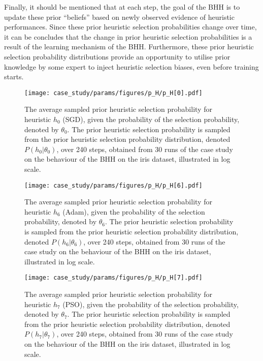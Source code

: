 Finally, it should be mentioned that at each step, the goal of the \acs{BHH} is to update these prior ``beliefs'' based on newly observed evidence of heuristic performances. Since these prior heuristic selection probabilities change over time, it can be concludes that the change in prior heuristic selection probabilities is a result of the learning mechanism of the \acs{BHH}. Furthermore, these prior heuristic selection probability distributions provide an opportunity to utilise prior knowledge by some expert to inject heuristic selection biases, even before training starts.

\begin{figure}[htpb]
	\centering
	\texttt{[image: case\_study/params/figures/p\_H/p\_H[0].pdf]}
	\caption{The average sampled prior heuristic selection probability for heuristic $h_{0}$ (\acs{SGD}), given the probability of the selection probability, denoted by $\theta_{0}$. The prior heuristic selection probability is sampled from the prior heuristic selection probability distribution, denoted $P(h_{0} \vert \theta_{0})$, over 240 steps, obtained from 30 runs of the case study on the behaviour of the \acs{BHH} on the iris dataset, illustrated in log scale.}
	\label{fig:results:case_study:p_H:0}
\end{figure}

\begin{figure}[htpb]
	\centering
	\texttt{[image: case\_study/params/figures/p\_H/p\_H[6].pdf]}
	\caption{The average sampled prior heuristic selection probability for heuristic $h_{6}$ (\acs{Adam}), given the probability of the selection probability, denoted by $\theta_{6}$. The prior heuristic selection probability is sampled from the prior heuristic selection probability distribution, denoted $P(h_{6} \vert \theta_{6})$, over 240 steps, obtained from 30 runs of the case study on the behaviour of the \acs{BHH} on the iris dataset, illustrated in log scale.}
	\label{fig:results:case_study:p_H:6}
\end{figure}

\begin{figure}[htpb]
	\centering
	\texttt{[image: case\_study/params/figures/p\_H/p\_H[7].pdf]}
	\caption{The average sampled prior heuristic selection probability for heuristic $h_{7}$ (\acs{PSO}), given the probability of the selection probability, denoted by $\theta_{7}$. The prior heuristic selection probability is sampled from the prior heuristic selection probability distribution, denoted $P(h_{7} \vert \theta_{7})$, over 240 steps, obtained from 30 runs of the case study on the behaviour of the \acs{BHH} on the iris dataset, illustrated in log scale.}
	\label{fig:results:case_study:p_H:7}
\end{figure}

